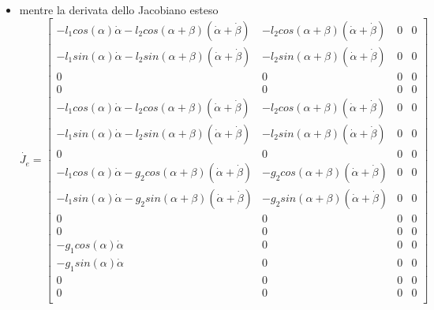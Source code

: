 \begin{itemize}
\[\begin{bmatrix}
		l_1cos(\alpha)+l_2cos(\alpha+\beta) & l_2cos(\alpha+\beta) & 0 & 0\\
		0 & 0 & -1 & 0\\
		-l_1sin(\alpha)-g_2sin(\alpha+\beta) & -g_2sin(\alpha+\beta) & 0 & 0\\
		l_1cos(\alpha)+g_2cos(\alpha+\beta) & g_2cos(\alpha+\beta) & 0 & 0\\
		0 & 0 & 0 & 0\\
		1 & 1 & 0 & 0\\
		-g_1sin(\alpha) & 0 & 0 & 0\\
		g_1cos(\alpha) & 0 & 0 & 0\\
		0 & 0 & 0 & 0\\
		1 & 0 & 0 & 0\\
	\end{bmatrix}
	\]
	\item mentre la derivata dello Jacobiano esteso 
	\[ \Dot{J_e} =
	\begin{bmatrix}
		-l_1cos(\alpha)\Dot{\alpha}-l_2cos(\alpha+\beta)(\Dot{\alpha}+\Dot{\beta}) & -l_2cos(\alpha+\beta)(\Dot{\alpha}+\Dot{\beta}) & 0 & 0\\
		-l_1sin(\alpha)\Dot{\alpha}-l_2sin(\alpha+\beta)(\Dot{\alpha}+\Dot{\beta}) & -l_2sin(\alpha+\beta)(\Dot{\alpha}+\Dot{\beta}) & 0 & 0\\
		0 & 0 & 0 & 0\\
		0 & 0 & 0 & 0\\
		-l_1cos(\alpha)\Dot{\alpha}-l_2cos(\alpha+\beta)(\Dot{\alpha}+\Dot{\beta}) & -l_2cos(\alpha+\beta)(\Dot{\alpha}+\Dot{\beta}) & 0 & 0\\
		-l_1sin(\alpha)\Dot{\alpha}-l_2sin(\alpha+\beta)(\Dot{\alpha}+\Dot{\beta}) & -l_2sin(\alpha+\beta)(\Dot{\alpha}+\Dot{\beta}) & 0 & 0\\
		0 & 0 & 0 & 0\\
		-l_1cos(\alpha)\Dot{\alpha}-g_2cos(\alpha+\beta)(\Dot{\alpha}+\Dot{\beta}) & -g_2cos(\alpha+\beta)(\Dot{\alpha}+\Dot{\beta}) & 0 & 0\\
		-l_1sin(\alpha)\Dot{\alpha}-g_2sin(\alpha+\beta)(\Dot{\alpha}+\Dot{\beta}) & -g_2sin(\alpha+\beta)(\Dot{\alpha}+\Dot{\beta}) & 0 & 0\\
		0 & 0 & 0 & 0\\
		0 & 0 & 0 & 0\\
		-g_1cos(\alpha)\Dot{\alpha} & 0 & 0 & 0\\
		-g_1sin(\alpha)\Dot{\alpha} & 0 & 0 & 0\\
		0 & 0 & 0 & 0\\
		0 & 0 & 0 & 0\\
	\end{bmatrix}
	\]
\end{itemize} 


